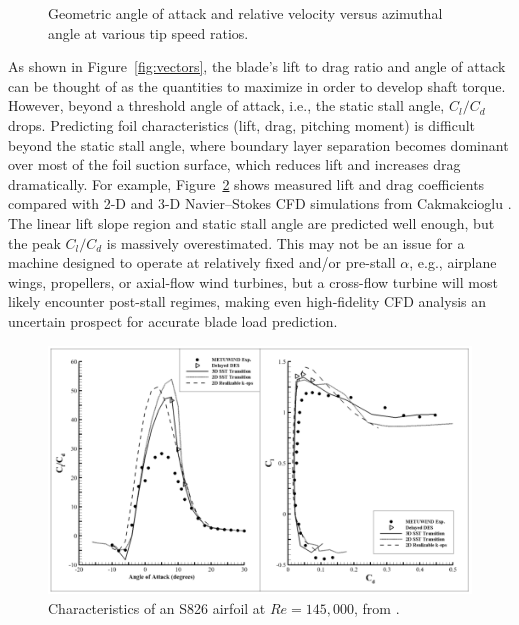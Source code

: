 \begin{figure}[ht]
    \caption{Geometric angle of attack and relative velocity versus azimuthal
        angle at various tip speed ratios.}
    
    \label{fig:geom-alpha-urel}
\end{figure}

As shown in Figure~\ref{fig:vectors}, the blade's lift to drag ratio and angle
of attack can be thought of as the quantities to maximize in order to develop
shaft torque. However, beyond a threshold angle of attack, i.e., the static
stall angle, $C_l/C_d$ drops. Predicting foil characteristics (lift, drag,
pitching moment) is difficult beyond the static stall angle, where boundary
layer separation becomes dominant over most of the foil suction surface, which
reduces lift and increases drag dramatically. For example,
Figure~\ref{fig:S826-perf} shows measured lift and drag coefficients compared
with 2-D and 3-D Navier--Stokes CFD simulations from Cakmakcioglu \etal
\cite{Cakmakcioglu2014}. The linear lift slope region and static stall angle are
predicted well enough, but the peak $C_l/C_d$ is massively overestimated. This
may not be an issue for a machine designed to operate at relatively fixed and/or
pre-stall $\alpha$, e.g., airplane wings, propellers, or axial-flow wind
turbines, but a cross-flow turbine will most likely encounter post-stall
regimes, making even high-fidelity CFD analysis an uncertain prospect for
accurate blade load prediction.


\begin{figure}[ht]
    \centering
    
    \includegraphics[width=\textwidth]{figures/cakmak-et-al-2014-fig8}
    
    \caption{Characteristics of an S826 airfoil at $Re=145,000$, from
        \cite{Cakmakcioglu2014}.}
    
    \label{fig:S826-perf}
\end{figure}


